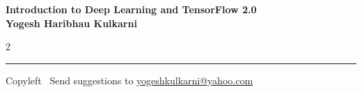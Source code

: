 \documentclass[8pt,landscape]{article}
\begin{document}
\footnotesize


\begin{center}
\Large{\textbf{Introduction to Deep Learning and TensorFlow 2.0\\ Yogesh Haribhau Kulkarni}}  
\end{center}

\begin{multicols}{2}

\end{multicols}

\rule{\linewidth}{0.25pt}
\scriptsize
Copyleft \textcopyleft\  Send suggestions to 
\href{http://yati.io}{yogeshkulkarni@yahoo.com}
\end{document}
